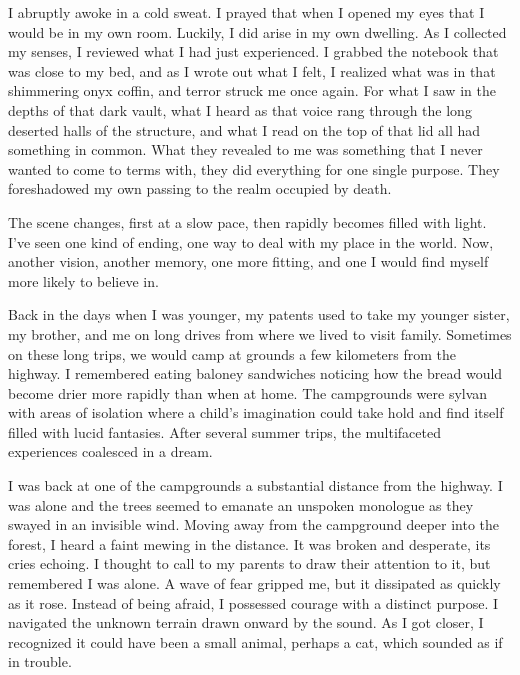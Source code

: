 I abruptly awoke in a cold sweat. I prayed that when I opened my eyes
that I would be in my own room. Luckily, I did arise in my own dwelling.
As I collected my senses, I reviewed what I had just experienced. I
grabbed the notebook that was close to my bed, and as I wrote out what I
felt, I realized what was in that shimmering onyx coffin, and terror
struck me once again. For what I saw in the depths of that dark vault,
what I heard as that voice rang through the long deserted halls of the
structure, and what I read on the top of that lid all had something in
common. What they revealed to me was something that I never wanted to
come to terms with, they did everything for one single purpose. They
foreshadowed my own passing to the realm occupied by death.

The scene changes, first at a slow pace, then rapidly becomes filled
with light. I've seen one kind of ending, one way to deal with my place
in the world. Now, another vision, another memory, one more fitting, and
one I would find myself more likely to believe in.

Back in the days when I was younger, my patents used to take my younger
sister, my brother, and me on long drives from where we lived to visit
family. Sometimes on these long trips, we would camp at grounds a few
kilometers from the highway. I remembered eating baloney sandwiches
noticing how the bread would become drier more rapidly than when at
home. The campgrounds were sylvan with areas of isolation where a
child's imagination could take hold and find itself filled with lucid
fantasies. After several summer trips, the multifaceted experiences
coalesced in a dream.

I was back at one of the campgrounds a substantial distance from the
highway. I was alone and the trees seemed to emanate an unspoken
monologue as they swayed in an invisible wind. Moving away from the
campground deeper into the forest, I heard a faint mewing in the
distance. It was broken and desperate, its cries echoing. I thought to
call to my parents to draw their attention to it, but remembered I was
alone. A wave of fear gripped me, but it dissipated as quickly as it
rose. Instead of being afraid, I possessed courage with a distinct
purpose. I navigated the unknown terrain drawn onward by the sound. As I
got closer, I recognized it could have been a small animal, perhaps a
cat, which sounded as if in trouble.

